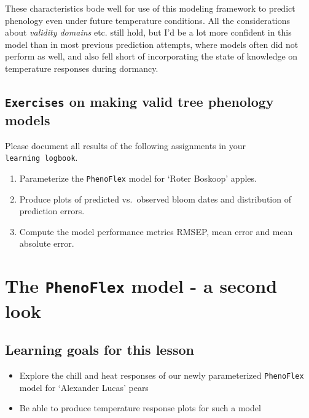 \documentclass[
]{book}
\providecommand{\tightlist}{%
  \setlength{\itemsep}{0pt}\setlength{\parskip}{0pt}}
\begin{document}
These characteristics bode well for use of this modeling framework to predict phenology even under future temperature conditions. All the considerations about \emph{validity domains} etc. still hold, but I'd be a lot more confident in this model than in most previous prediction attempts, where models often did not perform as well, and also fell short of incorporating the state of knowledge on temperature responses during dormancy.

\hypertarget{ex_model_phenoflex}{%
\section*{\texorpdfstring{\texttt{Exercises} on making valid tree phenology models}{Exercises on making valid tree phenology models}}\label{ex_model_phenoflex}}

Please document all results of the following assignments in your \texttt{learning\ logbook}.

\begin{enumerate}
\def\labelenumi{\arabic{enumi})}
\tightlist
\item
  Parameterize the \texttt{PhenoFlex} model for `Roter Boskoop' apples.
\item
  Produce plots of predicted vs.~observed bloom dates and distribution of prediction errors.
\item
  Compute the model performance metrics RMSEP, mean error and mean absolute error.
\end{enumerate}

\hypertarget{phenoflex2}{%
\chapter{\texorpdfstring{The \texttt{PhenoFlex} model - a second look}{The PhenoFlex model - a second look}}\label{phenoflex2}}

\hypertarget{goals_phenoflex2}{%
\section*{Learning goals for this lesson}\label{goals_phenoflex2}}

\begin{itemize}
\tightlist
\item
  Explore the chill and heat responses of our newly parameterized \texttt{PhenoFlex} model for `Alexander Lucas' pears
\item
  Be able to produce temperature response plots for such a model
\end{itemize}
\end{document}
